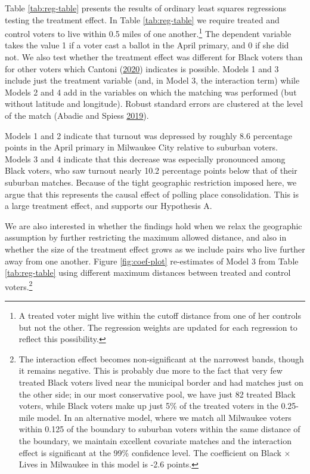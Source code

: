 \documentclass[
  12pt,
]{article}
\begin{document}
Table \ref{tab:reg-table} presents the results of ordinary least squares regressions testing the treatment effect. In Table \ref{tab:reg-table} we require treated and control voters to live within 0.5 miles of one another.\footnote{A treated voter might live within the cutoff distance from one of her controls but not the other. The regression weights are updated for each regression to reflect this possibility.} The dependent variable takes the value 1 if a voter cast a ballot in the April primary, and 0 if she did not. We also test whether the treatment effect was different for Black voters than for other voters which Cantoni (\protect\hyperlink{ref-Cantoni2020}{2020}) indicates is possible. Models 1 and 3 include just the treatment variable (and, in Model 3, the interaction term) while Models 2 and 4 add in the variables on which the matching was performed (but without latitude and longitude). Robust standard errors are clustered at the level of the match (Abadie and Spiess \protect\hyperlink{ref-Abadie2019}{2019}).

\begin{singlespace}


\end{singlespace}

Models 1 and 2 indicate that turnout was depressed by roughly 8.6 percentage points in the April primary in Milwaukee City relative to suburban voters. Models 3 and 4 indicate that this decrease was especially pronounced among Black voters, who saw turnout nearly 10.2 percentage points below that of their suburban matches. Because of the tight geographic restriction imposed here, we argue that this represents the causal effect of polling place consolidation. This is a large treatment effect, and supports our Hypothesis A.

We are also interested in whether the findings hold when we relax the geographic assumption by further restricting the maximum allowed distance, and also in whether the size of the treatment effect grows as we include pairs who live further away from one another. Figure \ref{fig:coef-plot} re-estimates of Model 3 from Table \ref{tab:reg-table} using different maximum distances between treated and control voters.\footnote{The interaction effect becomes non-significant at the narrowest bands, though it remains negative. This is probably due more to the fact that very few treated Black voters lived near the municipal border and had matches just on the other side; in our most conservative pool, we have just 82 treated Black voters, while Black voters make up just 5\% of the treated voters in the 0.25-mile model. In an alternative model, where we match all Milwaukee voters within 0.125 of the boundary to suburban voters within the same distance of the boundary, we maintain excellent covariate matches and the interaction effect is significant at the 99\% confidence level. The coefficient on Black × Lives in Milwaukee in this model is -2.6 points.}
\end{document}
